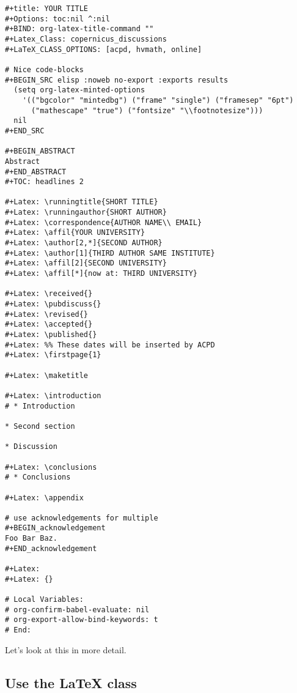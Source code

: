 \documentclass[11pt]{article}
\begin{document}
\begin{verbatim}
#+title: YOUR TITLE
#+Options: toc:nil ^:nil
#+BIND: org-latex-title-command ""
#+Latex_Class: copernicus_discussions
#+LaTeX_CLASS_OPTIONS: [acpd, hvmath, online]

# Nice code-blocks
#+BEGIN_SRC elisp :noweb no-export :exports results
  (setq org-latex-minted-options
    '(("bgcolor" "mintedbg") ("frame" "single") ("framesep" "6pt") 
      ("mathescape" "true") ("fontsize" "\\footnotesize")))
  nil
#+END_SRC

#+BEGIN_ABSTRACT
Abstract
#+END_ABSTRACT
#+TOC: headlines 2

#+Latex: \runningtitle{SHORT TITLE}
#+Latex: \runningauthor{SHORT AUTHOR}
#+Latex: \correspondence{AUTHOR NAME\\ EMAIL}
#+Latex: \affil{YOUR UNIVERSITY}
#+Latex: \author[2,*]{SECOND AUTHOR}
#+Latex: \author[1]{THIRD AUTHOR SAME INSTITUTE}
#+Latex: \affil[2]{SECOND UNIVERSITY}
#+Latex: \affil[*]{now at: THIRD UNIVERSITY}

#+Latex: \received{}
#+Latex: \pubdiscuss{}
#+Latex: \revised{}
#+Latex: \accepted{}
#+Latex: \published{}
#+Latex: %% These dates will be inserted by ACPD
#+Latex: \firstpage{1}

#+Latex: \maketitle

#+Latex: \introduction
# * Introduction

* Second section

* Discussion

#+Latex: \conclusions
# * Conclusions

#+Latex: \appendix

# use acknowledgements for multiple
#+BEGIN_acknowledgement
Foo Bar Baz.
#+END_acknowledgement

#+Latex: 
#+Latex: {}

# Local Variables:
# org-confirm-babel-evaluate: nil
# org-export-allow-bind-keywords: t
# End:
\end{verbatim}

\normalsize

Let’s look at this in more detail.

\subsection*{Use the \LaTeX{} class}
\label{sec-3-1}
\end{document}
